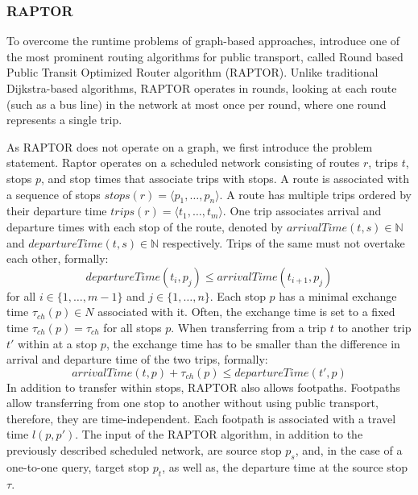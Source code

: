 \subsubsection{RAPTOR}
\label{subsubsec:raptor}

To overcome the runtime problems of graph-based approaches,  introduce one of the most prominent routing algorithms for public transport, called Round based Public Transit Optimized Router algorithm (RAPTOR). %
Unlike traditional Dijkstra-based algorithms, RAPTOR operates in rounds, looking at each route (such as a bus line) in the network at most once per round, where one round represents a single trip.

As RAPTOR does not operate on a graph, we first introduce the problem statement.
Raptor operates on a scheduled network consisting of routes \(r\), trips \(t\), stops \(p\), and stop times that associate trips with stops.
A route is associated with a sequence of stops \(stops(r) = \langle p_1, \dots, p_n \rangle\).
A route has multiple trips ordered by their departure time \(trips(r) = \langle t_1, \dots, t_m \rangle\).
One trip associates arrival and departure times with each stop of the route, denoted by \(arrivalTime(t, s) \in \mathbb{N}\) and \(departureTime(t, s) \in \mathbb{N}\) respectively.
Trips of the same must not overtake each other, formally:
\[departureTime(t_i, p_j) \leq arrivalTime(t_{i+1}, p_j)\]
for all \(i \in \{1, \dots, m-1\}\) and \(j \in \{1, \dots, n\}\).
Each stop \(p\) has a minimal exchange time \(\tau_{ch}(p) \in N\) associated with it.
Often, the exchange time is set to a fixed time \(\tau_{ch}(p) = \tau_{ch}\) for all stops \(p\).
When transferring from a trip \(t\) to another trip \(t'\) within at a stop \(p\), the exchange time has to be smaller than the difference in arrival and departure time of the two trips, formally:
\[arrivalTime(t, p) + \tau_{ch}(p) \leq departureTime(t', p) \]
In addition to transfer within stops, RAPTOR also allows footpaths.
Footpaths allow transferring from one stop to another without using public transport, therefore, they are time-independent.
Each footpath is associated with a travel time \(l(p, p')\).
The input of the RAPTOR algorithm, in addition to the previously described scheduled network, are source stop \(p_s\), and, in the case of a one-to-one query, target stop \(p_t\), as well as, the departure time at the source stop \(\tau\).

